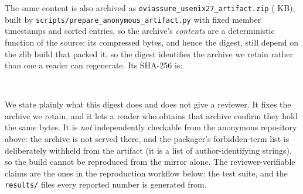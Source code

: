 \documentclass[letterpaper,10pt,twocolumn]{article}
\theoremstyle{definition}
\begin{document}
The same content is also archived as \nolinkurl{eviassure_usenix27_artifact.zip} (\artifactSizeKb{} KB), built by \nolinkurl{scripts/prepare_anonymous_artifact.py} with fixed member timestamps and sorted entries, so the archive's \emph{contents} are a deterministic function of the source; its compressed bytes, and hence the digest, still depend on the zlib build that packed it, so the digest identifies the archive we retain rather than one a reader can regenerate. Its SHA-256 is:
\begin{center}
\texttt{\artifactShaPartOne}\\
\texttt{\artifactShaPartTwo}
\end{center}
We state plainly what this digest does and does not give a reviewer. It fixes the archive we retain, and it lets a reader who obtains that archive confirm they hold the same bytes. It is \emph{not} independently checkable from the anonymous repository above: the archive is not served there, and the packager's forbidden-term list is deliberately withheld from the artifact (it is a list of author-identifying strings), so the build cannot be reproduced from the mirror alone. The reviewer-verifiable claims are the ones in the reproduction workflow below: the test suite, and the \nolinkurl{results/} files every reported number is generated from.
\end{document}
